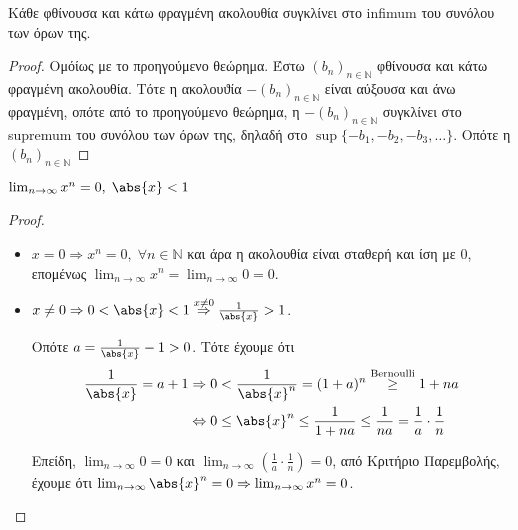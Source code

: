 \documentclass[main.tex]{subfiles}
\begin{document}
\begin{thm}
    Κάθε φθίνουσα και κάτω φραγμένη ακολουθία συγκλίνει στο infimum του 
    συνόλου των όρων της.
\end{thm}

\begin{proof}
    Ομόίως με το προηγούμενο θεώρημα. Έστω 
    $ (b_{n})_{n \in \mathbb{N}} $ 
    φθίνουσα και κάτω φραγμένη ακολουθία. Τότε η ακολουϑία 
    $ -(b_{n})_{n \in \mathbb{N}} $ είναι αύξουσα και άνω φραγμένη, 
    οπότε από το προηγούμενο θεώρημα, η $ -(b_{n})_{n \in \mathbb{N}} $
    συγκλίνει στο supremum του συνόλου των όρων της, δηλαδή στο  
    $ \sup \{ - b_{1}, - b_{2}, -b_{3}, \ldots \}$. Οπότε η 
    $ (b_{n})_{n \in \mathbb{N}} $ 
\end{proof}

\begin{prop}
    $ \lim_{n \to \infty} x^{n} = 0, \; \abs{x} <1  $
\end{prop}

\begin{proof}
\item {}
    \begin{itemize}
        \item $ x = 0 \Rightarrow x^{n} = 0, \; \forall n \in 
            \mathbb{N} $ και άρα η ακολουθία είναι σταθερή και ίση με 
            0, επομένως 
            $ \lim_{n \to \infty} x^{n} = \lim_{n \to \infty} 0 = 0 $.

        \item $ x \neq 0 \Rightarrow 0 < \abs{x} < 1 
            \overset{x \neq 0}{\Rightarrow} \frac{1}{\abs{x}} > 1  $. 

            Οπότε $ a = \frac{1}{\abs{x}} - 1 > 0 $. Τότε έχουμε ότι 
            \begin{align*} 
                \frac{1}{\abs{x}} = a+1 
                    &\Rightarrow 0< \frac{1}{\abs{x}^{n}}  = (1+a)^{n}
                    \overset{\text{Bernoulli}}{\geq} 1 + na \\ 
                    & \Leftrightarrow 0 \leq \abs{x}^{n} \leq 
                    \frac{1}{1+na} \leq \frac{1}{na} = \frac{1}{a} 
                    \cdot \frac{1}{n} 
            \end{align*} 

            Επείδη, $ \lim_{n \to \infty} 0 = 0 $ και 
            $ \lim_{n \to \infty} \left(\frac{1}{a} \cdot \frac{1}{n} 
            \right) = 0$, από Κριτήριο Παρεμβολής, έχουμε ότι 
            $ \lim_{n \to \infty} \abs{x} ^{n} = 
            0 \Rightarrow \lim_{n \to \infty}x^{n} = 0$.
    \end{itemize}
\end{proof}
\end{document}

